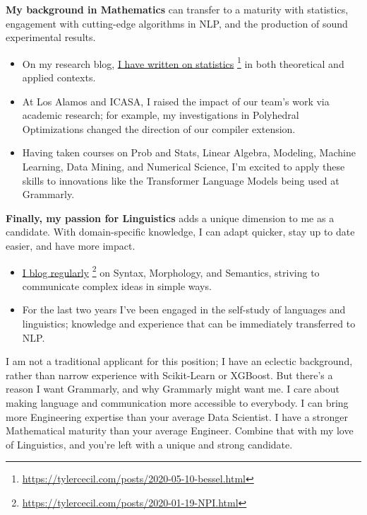 \documentclass[sans, a4paper]{article}
\newcommand{\cvcolor}[1]{{\color{MidnightBlue}#1}}
\renewcommand{\hl}[1]{\cvcolor{\textbf{#1}}}
\renewcommand{\cite}[2]{\href{#2}{\ul{#1}} \footnote{\href{#2}{#2}}}
\begin{document}
\begin{adjustwidth}{40pt}{40pt}
  \hl{My background in Mathematics} can transfer to a maturity with statistics,
  engagement with cutting-edge algorithms in NLP, and the production of sound
  experimental results.
  \begin{itemize}
    \item On my research blog, \cite{I have written on statistics}
      {https://tylercecil.com/posts/2020-05-10-bessel.html}
      in both theoretical and applied contexts.
    \item At Los Alamos and ICASA, I raised the impact of our team's work via
      academic research; for example, my investigations in Polyhedral
      Optimizations changed the direction of our compiler extension.
    \item Having taken courses on Prob and Stats, Linear Algebra, Modeling,
      Machine Learning, Data Mining, and Numerical Science, I'm excited to
      apply these skills to innovations like the Transformer Language Models
      being used at Grammarly.
  \end{itemize} \medskip

  \hl{Finally, my passion for Linguistics} adds a unique dimension to me as a
  candidate. With domain-specific knowledge, I can adapt quicker, stay up to
  date easier, and have more impact.
  \begin{itemize}
    \item \cite{I blog
      regularly}{https://tylercecil.com/posts/2020-01-19-NPI.html} on Syntax,
      Morphology, and Semantics, striving to communicate complex ideas in
      simple ways.
    \item  For the last two years I've been engaged in the self-study of
      languages and linguistics; knowledge and experience that can be
      immediately transferred to NLP.
  \end{itemize}\medskip

  I am not a traditional applicant for this position; I have an eclectic
  background, rather than narrow experience with Scikit-Learn or XGBoost.  But
  there's a reason I want Grammarly, and why Grammarly might want me. I care
  about making language and communication more accessible to everybody. I can
  bring more Engineering expertise than your average Data Scientist. I have a
  stronger Mathematical maturity than your average Engineer. Combine that with
  my love of Linguistics, and you're left with a unique and strong candidate.
  \medskip


\end{adjustwidth}
\end{document}

